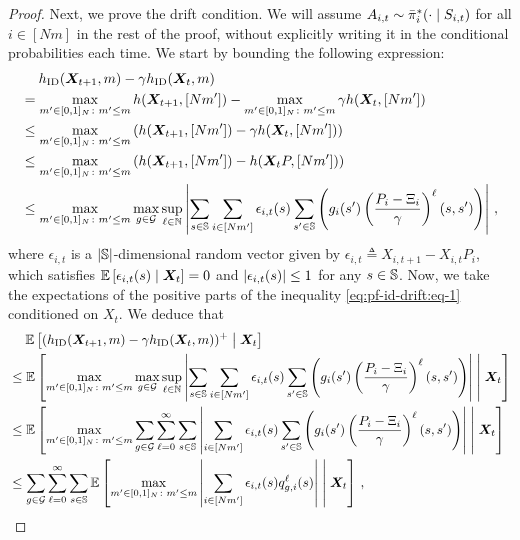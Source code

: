\begin{proof}
    Next, we prove the drift condition. We will assume $A_{i,t}\sim {{\bar{\pi}}^*}_i(\cdot\;|\; S_{i,t})$ for all $i\in [Nm]$ in the rest of the proof, without explicitly writing it in the conditional probabilities each time. 
    We start by bounding the following expression: 
    \begin{align}
        \nonumber
        &\mspace{23mu} h_{\textnormal{ID}}({\bm{X}}_{t+1},m)-\gamma h_{\textnormal{ID}}({\bm{X}}_{t},m)\\
        \nonumber
        &= \max_{m'\in[0,1]_N\colon m'\leq m} h({\bm{X}}_{t+1},[Nm']) - \max_{m'\in[0,1]_N\colon m'\leq m} \gamma h({\bm{X}}_t,[Nm'])\\
        \nonumber
        &\leq \max_{m'\in[0,1]_N\colon m'\leq m} \left(h({\bm{X}}_{t+1},[Nm'])-\gamma h({\bm{X}}_t,[Nm'])\right)\\ 
        \nonumber
        &\leq \max_{m'\in[0,1]_N\colon m'\leq m} \left(h({\bm{X}}_{t+1},[Nm']) - h({\bm{X}}_tP,[Nm'])\right)\\
        \label{eq:pf-id-drift:eq-1}
        &\leq \max_{m'\in[0,1]_N\colon m'\leq m} \max_{g\in \mathcal{G}} \sup_{\ell\in\mathbb{N}} \left\lvert\sum_{s\in\mathbb{S}} \sum_{i\in[Nm']} \epsilon_{i,t}(s)\sum_{s'\in\mathbb{S}}\left(g_i(s')\left(\frac{P_i-\Xi_i}{\gamma}\right)^{\ell}(s,s')\right)\right\rvert \,,
    \end{align}
    where $\epsilon_{i,t}$ is a $\lvert\mathbb{S}\rvert$-dimensional random vector given by $\epsilon_{i,t} \triangleq X_{i,t+1}-X_{i,t}P_i$, 
    which satisfies $\mathbb{E}\left[\epsilon_{i,t}(s)\;\middle|\;{\bm{X}}_t\right]=0$ and $\left\lvert\epsilon_{i,t}(s)\right\rvert\leq 1$ for any $s\in\mathbb{S}$. 
    Now, we take the expectations of the positive parts of the inequality \eqref{eq:pf-id-drift:eq-1} conditioned on $X_t$. We deduce that 
    \begin{align}
        \nonumber
        &\mspace{23mu} \mathbb{E}\left[(h_{\textnormal{ID}}({\bm{X}}_{t+1},m)-\gamma h_{\textnormal{ID}}({\bm{X}}_{t},m))^+\;\middle|\;{\bm{X}}_t\right]\\
        \nonumber
        &\leq \mathbb{E}\left[\max_{m'\in[0,1]_N\colon m'\leq m} \max_{g\in \mathcal{G}} \sup_{\ell\in\mathbb{N}} \left\lvert\sum_{s\in\mathbb{S}} \sum_{i\in[Nm']} \epsilon_{i,t}(s)\sum_{s'\in\mathbb{S}}\left(g_i(s')\left(\frac{P_i-\Xi_i}{\gamma}\right)^{\ell}(s,s')\right)\right\rvert\;\middle|\; {\bm{X}}_t\right] \\
        \nonumber
        &\leq \mathbb{E}\left[\max_{m'\in[0,1]_N\colon m'\leq m} \sum_{g\in \mathcal{G}} \sum_{\ell=0}^\infty \sum_{s\in\mathbb{S}} \left\lvert\sum_{i\in[Nm']} \epsilon_{i,t}(s)\sum_{s'\in\mathbb{S}}\left(g_i(s')\left(\frac{P_i-\Xi_i}{\gamma}\right)^{\ell}(s,s')\right)\right\rvert \;\middle|\; {\bm{X}}_t\right]\\
        \label{eq:pf-hid-drift:before-apply-martingale}
        &\leq \sum_{g\in \mathcal{G}} \sum_{\ell=0}^\infty \sum_{s\in\mathbb{S}}\mathbb{E}\left[\max_{m'\in[0,1]_N\colon m'\leq m}\left\lvert\sum_{i\in[Nm']}\epsilon_{i,t}(s)q_{g,i}^{\ell}(s)\right\rvert \;\middle|\; {\bm{X}}_t\right]\,,
    \end{align}

\end{proof}
